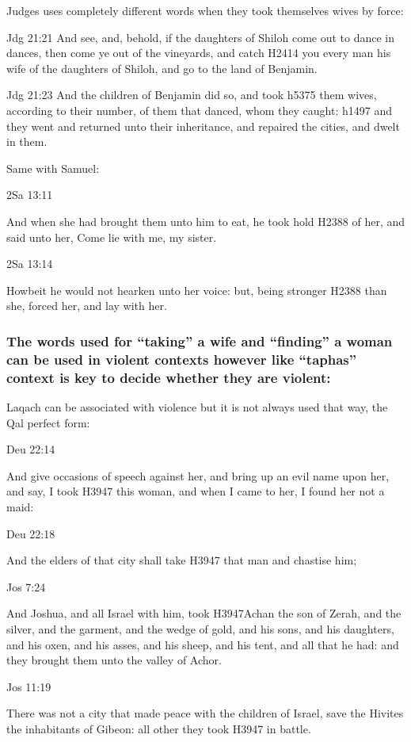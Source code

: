 \documentclass[11pt]{article}
\begin{document}
Judges uses completely different words when they took themselves wives by force:



Jdg 21:21
And see, and, behold, if the daughters of Shiloh come out to dance in dances, then come ye out of the vineyards, and catch H2414 you every man his wife of the daughters of Shiloh, and go to the land of Benjamin.


Jdg 21:23
And the children of Benjamin did so, and took h5375 them wives, according to their number, of them that danced, whom they caught: h1497 and they went and returned unto their inheritance, and repaired the cities, and dwelt in them.


Same with Samuel:


2Sa 13:11

And when she had brought them unto him to eat, he took hold H2388 of her, and said unto her, Come lie with me, my sister.

2Sa 13:14

Howbeit he would not hearken unto her voice: but, being stronger H2388 than she, forced her, and lay with her.


\subsubsection{The words used for “taking” a wife and “finding” a woman can be used in violent contexts however like “taphas” context is key to decide whether they are violent:}

Laqach can be associated with violence but it is not always used that way, the Qal perfect form:

 Deu 22:14

And give occasions of speech against her, and bring up an evil name upon her, and say, I took H3947 this woman, and when I came to her, I found her not a maid:


 Deu 22:18

And the elders of that city shall take H3947 that man and chastise him;


 Jos 7:24

And Joshua, and all Israel with him, took H3947Achan the son of Zerah, and the silver, and the garment, and the wedge of gold, and his sons, and his daughters, and his oxen, and his asses, and his sheep, and his tent, and all that he had: and they brought them unto the valley of Achor.


 Jos 11:19

There was not a city that made peace with the children of Israel, save the Hivites the inhabitants of Gibeon: all other they took H3947 in battle.
\end{document}
